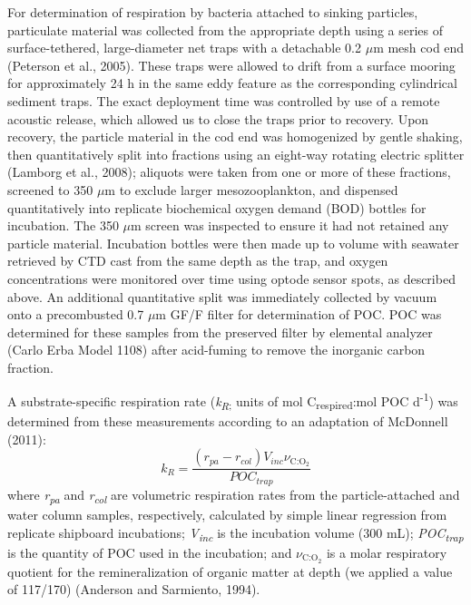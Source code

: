 For determination of respiration by bacteria attached to sinking particles, particulate material was collected from the appropriate depth using a series of surface-tethered, large-diameter net traps with a detachable 0.2 $\mu$m mesh cod end (Peterson et al., 2005). These traps were allowed to drift from a surface mooring for approximately 24 h in the same eddy feature as the corresponding cylindrical sediment traps. The exact deployment time was controlled by use of a remote acoustic release, which allowed us to close the traps prior to recovery.
Upon recovery, the particle material in the cod end was homogenized by gentle shaking, then quantitatively split into fractions using an eight-way rotating electric splitter (Lamborg et al., 2008); aliquots were taken from one or more of these fractions, screened to 350 $\mu$m to exclude larger mesozooplankton, and dispensed quantitatively into replicate biochemical oxygen demand (BOD) bottles for incubation. The 350 $\mu$m screen was inspected to ensure it had not retained any particle material. Incubation bottles were then made up to volume with seawater retrieved by CTD cast from the same depth as the trap, and oxygen concentrations were monitored over time using optode sensor spots, as described above. An additional quantitative split was immediately collected by vacuum onto a precombusted 0.7 $\mu$m GF/F filter for determination of POC. POC was determined for these samples from the preserved filter by elemental analyzer (Carlo Erba Model 1108) after acid-fuming to remove the inorganic carbon fraction.

A substrate-specific respiration rate (\emph{k\textsubscript{R}}\textsubscript{;} units of mol C\textsubscript{respired}:mol POC d\textsuperscript{-1}) was determined from these measurements according to an adaptation of McDonnell (2011):
\begin{equation} \label{eq:c2e3}
{k_R} = \frac{{({r_{pa}} - {r_{col}}){V_{inc}}{\nu _{{\text{C:}}{{\text{O}}_{\text{2}}}}}}}{{PO{C_{trap}}}}
\end{equation}
where \emph{r\textsubscript{pa}} and \emph{r\textsubscript{col}} are volumetric respiration rates from the particle-attached and water column samples, respectively, calculated by simple linear regression from replicate shipboard incubations; \emph{V\textsubscript{inc}} is the incubation volume (300 mL); \emph{POC\textsubscript{trap}} is the quantity of POC used in the incubation; and $\nu _{{\text{C:}}{{\text{O}}_{\text{2}}}}$ is a molar respiratory quotient for the remineralization of organic matter at depth (we applied a value of 117/170) (Anderson and Sarmiento, 1994).

